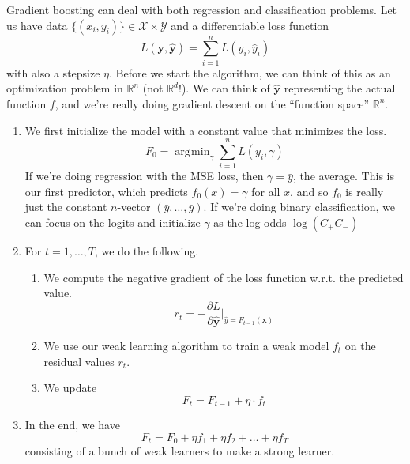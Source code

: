 \documentclass{article}
\DeclareMathOperator*{\argmin}{\arg\!\min}
\begin{document}
    Gradient boosting can deal with both regression and classification problems. Let us have data $\{(x_i, y_i)\} \in \mathcal{X} \times \mathcal{Y}$ and a differentiable loss function 
    \begin{equation}
      L(\mathbf{y}, \hat{\mathbf{y}}) = \sum_{i=1}^n L(y_i, \hat{y}_i)
    \end{equation}
    with also a stepsize $\eta$. Before we start the algorithm, we can think of this as an optimization problem in $\mathbb{R}^n$ (not $\mathbb{R}^d$!). We can think of $\hat{\mathbf{y}}$ representing the actual function $f$, and we're really doing gradient descent on the ``function space'' $\mathbb{R}^n$. 
    \begin{enumerate}
      \item We first initialize the model with a constant value that minimizes the loss. 
        \begin{equation}
          F_0 = \argmin_\gamma \sum_{i=1}^n L(y_i, \gamma)
        \end{equation}
        If we're doing regression with the MSE loss, then $\gamma = \bar{y}$, the average. This is our first predictor, which predicts $f_0 (x) = \gamma$ for all $x$, and so $f_0$ is really just the constant $n$-vector $(\bar{y}, \ldots, \bar{y})$. If we're doing binary classification, we can focus on the logits and initialize $\gamma$ as the log-odds $\log({C_+}{C_{-}})$

      \item For $t = 1, \ldots, T$, we do the following. 
        \begin{enumerate}
          \item We compute the negative gradient of the loss function w.r.t. the predicted value.  
            \begin{equation}
              r_t = - \frac{\partial L}{\partial \hat{\mathbf{y}}} \bigg|_{\hat{y} = F_{t-1} (\mathbf{x})}
            \end{equation}

          \item We use our weak learning algorithm to train a weak model $f_t$ on the residual values $r_t$. 

          \item We update  
            \begin{equation}
              F_t = F_{t-1} + \eta \cdot f_t
            \end{equation}
        \end{enumerate}
      \item In the end, we have 
        \begin{equation}
          F_t = F_0 + \eta f_1 + \eta f_2 + \ldots + \eta f_T
        \end{equation}
        consisting of a bunch of weak learners to make a strong learner. 
    \end{enumerate}
\end{document}
